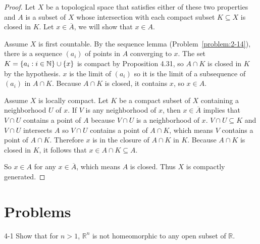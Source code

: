 \begin{proof}
	Let $X$ be a topological space that satisfies either of these two properties and $A$ is a subset of $X$ whose intersection with each compact subset $K\subseteq X$ is closed in $K$. Let $x \in \overline{A}$, we will show that $x\in A$.

	Assume $X$ is first countable. By the sequence lemma (Problem~\ref{problem:2-14}), there is a sequence ${(a_{i})}$ of points in $A$ converging to $x$. The set $K = \left\{{ a_{i} : i\in\mathbb{N} }\right\} \cup \left\{{x}\right\}$ is compact by Proposition 4.31, so $A\cap K$ is closed in $K$ by the hypothesis. $x$ is the limit of ${(a_{i})}$ so it is the limit of a subsequence of ${(a_{i})}$ in $A\cap K$. Because $A\cap K$ is closed, it contains $x$, so $x\in A$.

	Assume $X$ is locally compact. Let $K$ be a compact subset of $X$ containing a neighborhood $U$ of $x$. If $V$ is any neighborhood of $x$, then $x\in \overline{A}$ implies that $V\cap U$ contains a point of $A$ because $V\cap U$ is a neighborhood of $x$. $V\cap U \subseteq K$ and $V\cap U$ intersects $A$ so $V\cap U$ contains a point of $A\cap K$, which means $V$ contains a point of $A\cap K$. Therefore $x$ is in the closure of $A\cap K$ in $K$. Because $A\cap K$ is closed in $K$, it follows that $x \in A\cap K \subseteq A$.

	So $x\in A$ for any $x\in \overline{A}$, which means $A$ is closed. Thus $X$ is compactly generated.
\end{proof}

\section*{Problems}

\begin{problem}{4-1}\label{problem:4-1}
Show that for $n > 1$, $\mathbb{R}^{n}$ is not homeomorphic to any open subset of $\mathbb{R}$.
\end{problem}

